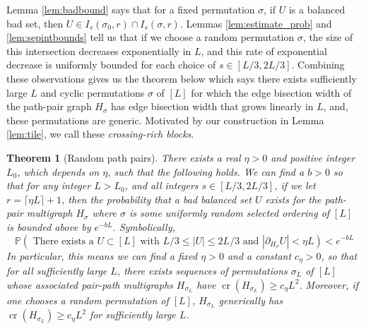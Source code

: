 \documentclass[11pt,a4paper]{amsart}
\newtheorem{theorem}{Theorem}
\theoremstyle{definition}
\theoremstyle{remark}
\DeclareMathOperator{\crn}{cr}
\newcommand{\Fpr}{\mathbb{P}}
\begin{document}
Lemma \ref{lem:badbound} says that for a fixed permutation $\sigma$, if $U$ is a balanced bad set, then $U \in I_{s}(\sigma_{0},r) \cap I_{s}(\sigma,r)$.  Lemmas \ref{lem:estimate_prob} and \ref{lem:sepintbounds} tell us that if we choose a random permutation $\sigma$, the size of this intersection decreases exponentially in $L$, and this rate of exponential decrease is uniformly bounded for each choice of $s \in [L/3,2L/3]$.  Combining these observations gives us the theorem below which says there exists sufficiently large $L$ and cyclic permutations $\sigma$ of $[L]$ for which the edge bisection width of the path-pair graph $H_{\sigma}$ has edge bisection width that grows linearly in $L$, and, these permutations are generic.  Motivated by our construction in Lemma \ref{lem:tile}, we call these \emph{crossing-rich blocks}.
%
\begin{theorem}[Random path pairs]\label{thm:random-path}
There exists a real $\eta > 0$ and positive integer $L_{0}$, which depends on $\eta$, such that the following holds.  We can find a $b > 0$ so that for any integer $L > L_{0}$, and all integers $s \in [L/3,2L/3]$, if we let $r = \lceil \eta L \rceil + 1$, then the probability that a bad balanced set $U$ exists for the path-pair multigraph $H_{\sigma}$ where $\sigma$ is some uniformly random selected ordering of $[L]$ is bounded above by $e^{-bL}$.  Symbolically, 
\begin{equation*}
\Fpr\left(\text{ There exists a }U \subset [L] \text{ with } L/3 \leq |U| \leq 2L/3 \text{ and } |\partial_{H_{\sigma}} U| < \eta L\right) < e^{-bL}
\end{equation*}
In particular, this means we can find a fixed $\eta > 0$ and a constant $c_{\eta} > 0$, so that for all sufficiently large $L$, there exists sequences of permutations $\sigma_{L}$ of $[L]$ whose associated pair-path multigraphs $H_{\sigma_{L}}$ have $\crn(H_{\sigma_{L}}) \geq c_{\eta} L^{2}$.  Moreover, if one chooses a random permutation of $[L]$, $H_{\sigma_{L}}$ generically has $\crn(H_{\sigma_{L}}) \geq c_{\eta} L^{2}$ for sufficiently large $L$.    
\end{theorem}
\end{document}
